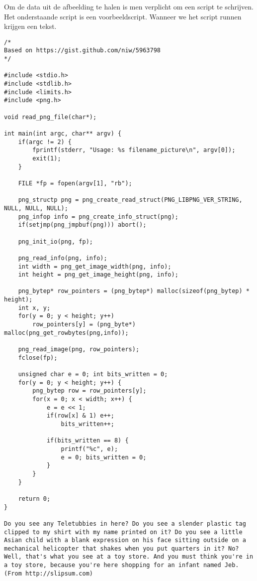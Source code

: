 Om de data uit de afbeelding te halen is men verplicht om een script te schrijven. Het onderstaande script is een voorbeeldscript. Wanneer we het script runnen krijgen een tekst.
\begin{lstlisting}
/*
Based on https://gist.github.com/niw/5963798
*/

#include <stdio.h>
#include <stdlib.h>
#include <limits.h>
#include <png.h>

void read_png_file(char*);

int main(int argc, char** argv) {
	if(argc != 2) {
		fprintf(stderr, "Usage: %s filename_picture\n", argv[0]);
		exit(1);
	}

	FILE *fp = fopen(argv[1], "rb");	

	png_structp png = png_create_read_struct(PNG_LIBPNG_VER_STRING, NULL, NULL, NULL);
	png_infop info = png_create_info_struct(png);
	if(setjmp(png_jmpbuf(png))) abort();

	png_init_io(png, fp);

	png_read_info(png, info);
	int width = png_get_image_width(png, info);
	int height = png_get_image_height(png, info);

	png_bytep* row_pointers = (png_bytep*) malloc(sizeof(png_bytep) * height);
	int x, y;
	for(y = 0; y < height; y++)
		row_pointers[y] = (png_byte*) malloc(png_get_rowbytes(png,info));

	png_read_image(png, row_pointers);
	fclose(fp);

	unsigned char e = 0; int bits_written = 0;
	for(y = 0; y < height; y++) {
		png_bytep row = row_pointers[y];
		for(x = 0; x < width; x++) {
			e = e << 1;
			if(row[x] & 1) e++;
				bits_written++;

			if(bits_written == 8) {
				printf("%c", e);
				e = 0; bits_written = 0;
			}
		}
	}

	return 0;
}

Do you see any Teletubbies in here? Do you see a slender plastic tag clipped to my shirt with my name printed on it? Do you see a little Asian child with a blank expression on his face sitting outside on a mechanical helicopter that shakes when you put quarters in it? No? Well, that's what you see at a toy store. And you must think you're in a toy store, because you're here shopping for an infant named Jeb. (From http://slipsum.com)
\end{lstlisting}
